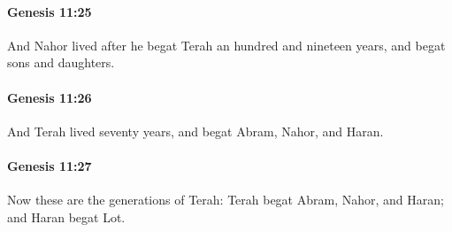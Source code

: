 		\paragraph{Genesis 11:25} %
			\label{GENESIS-11-25}

			And Nahor lived after he begat Terah an hundred and nineteen years, and begat sons and daughters.


		\paragraph{Genesis 11:26} %
			\label{GENESIS-11-26}

			And Terah lived seventy years, and begat Abram, Nahor, and Haran.


		\paragraph{Genesis 11:27} %
			\label{GENESIS-11-27}

			Now these are the generations of Terah: Terah begat Abram, Nahor, and Haran; and Haran begat Lot.


